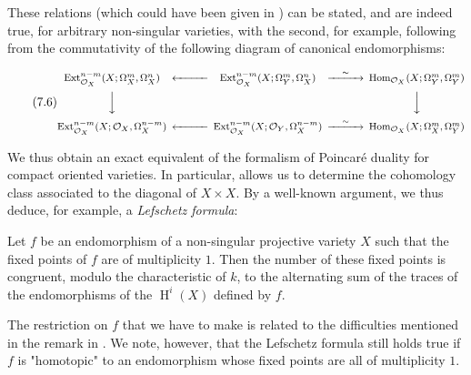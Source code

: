 These relations (which could have been given in ) can be stated, and are indeed true, for arbitrary non-singular varieties, with the second, for example, following from the commutativity of the following diagram of canonical endomorphisms:

\begin{equation}\tag{7.6}\label{fga1-equation-7.6}
  \footnotesize
  \begin{CD}
    \operatorname{Ext}_{\mathcal{O}_X}^{n-m}(X;\Omega_X^m,\Omega_X^n)
    @<<<
    \operatorname{Ext}_{\mathcal{O}_X}^{n-m}(X;\Omega_Y^m,\Omega_X^n)
    @>\sim>>
    \operatorname{Hom}_{\mathcal{O}_X}(X;\Omega_Y^m,\Omega_Y^m)
    \\@VVV @. @VVV
    \\\operatorname{Ext}_{\mathcal{O}_X}^{n-m}(X;\mathcal{O}_X,\Omega_X^{n-m})
    @<<<
    \operatorname{Ext}_{\mathcal{O}_X}^{n-m}(X;\mathcal{O}_Y,\Omega_X^{n-m})
    @>\sim>>
    \operatorname{Hom}_{\mathcal{O}_X}(X;\Omega_X^m,\Omega_Y^m)
  \end{CD}
\end{equation}

We thus obtain an exact equivalent of the formalism of Poincaré duality for compact oriented varieties.
In particular,  allows us to determine the cohomology class associated to the diagonal of $X\times X$.
By a well-known argument, we thus deduce, for example, a \emph{Lefschetz formula}:

\begin{theorem}\label{fga1-theorem-5}
  Let $f$ be an endomorphism of a non-singular projective variety $X$ such that the fixed points of $f$ are of multiplicity $1$.
  Then the number of these fixed points is congruent, modulo the characteristic of $k$, to the alternating sum of the traces of the endomorphisms of the $\operatorname{H}^i(X)$ defined by $f$.
\end{theorem}

The restriction on $f$ that we have to make is related to the difficulties mentioned in the remark in .
We note, however, that the Lefschetz formula still holds true if $f$ is "homotopic" to an endomorphism whose fixed points are all of multiplicity $1$.

